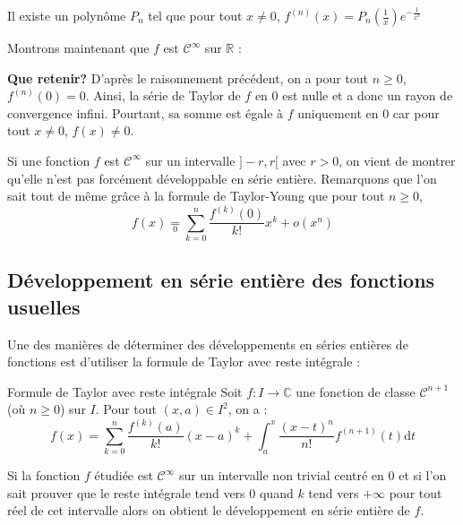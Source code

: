 \documentclass[french,11pt,twoside]{VcCours}
\newcommand{\dt}{\text{d}t}
\begin{document}
\begin{center}
\og{} Il existe un polynôme $P_n$ tel que pour tout $x \neq 0$, $f^{(n)}(x) = P_n \left(\frac{1}{x} \right) e^{- \frac{1}{x^2}}$ \fg
\end{center}

\newpage

\phantom{test}

\vspace*{ 7cm}

Montrons maintenant que $f$ est $\mathcal{C}^{\infty}$ sur $\mathbb{R}$ :

\vspace*{ 7cm}

\textbf{Que retenir?} D'après le raisonnement précédent, on a pour tout $n \geq 0$, $f^{(n)}(0)=0$. Ainsi, la série de Taylor de $f$ en $0$ est nulle et a donc un rayon de convergence infini. Pourtant, sa somme est égale à $f$ uniquement en $0$ car pour tout $x \neq 0$, $f(x) \neq 0$.

\begin{Remarque}{} Si une fonction $f$ est $\mathcal{C}^{\infty}$ sur un intervalle $]-r,r[$ avec $r>0$, on vient de montrer qu'elle n'est pas forcément développable en série entière. Remarquons que l'on sait tout de même grâce à la formule de Taylor-Young que pour tout $n \geq 0$,
$$ f(x) \underset{0}{=} \sum_{k=0}^n \dfrac{f^{(k)}(0)}{k!}x^k + o(x^n)$$
\end{Remarque}
\subsection{Développement en série entière des fonctions usuelles}
Une des manières de déterminer des développements en séries entières de fonctions est d'utiliser la formule de Taylor avec reste intégrale :

\begin{Theoreme}{Formule de Taylor avec reste intégrale} Soit $f : I \rightarrow \mathbb{C}$ une fonction de classe $\mathcal{C}^{n+1}$ (où $n \geq 0$) sur $I$. Pour tout $(x,a) \in I^2$, on a :
$$ f(x) = \sum_{k=0}^n \frac{f^{(k)}(a)}{k!}(x-a)^k + \int_{a}^x \frac{(x-t)^n}{n!} f^{(n+1)}(t) \dt$$
\end{Theoreme}

Si la fonction $f$ étudiée est $\mathcal{C}^{\infty}$ sur un intervalle non trivial centré en $0$ et si l'on sait prouver que le reste intégrale tend vers $0$ quand $k$ tend vers $+ \infty$ pour tout réel de cet intervalle alors on obtient le développement en série entière de $f$.
\end{document}
